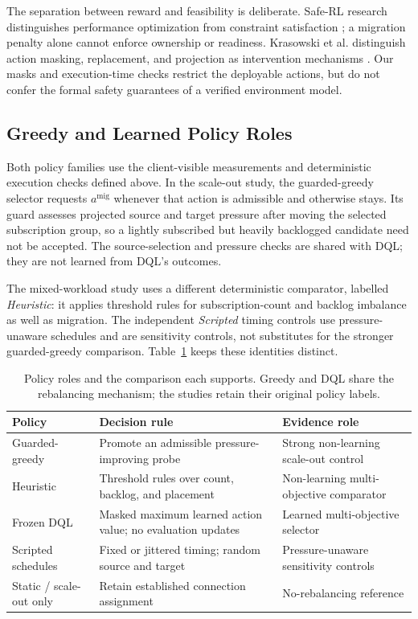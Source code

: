 \documentclass[manuscript,nonacm]{acmart}
\begin{document}
The separation between reward and feasibility is deliberate. Safe-RL research
distinguishes performance optimization from constraint satisfaction
\cite{Gu2024SafeRL}; a migration penalty alone cannot enforce ownership or
readiness. Krasowski et al. distinguish action masking, replacement, and
projection as intervention mechanisms \cite{Krasowski2023ProvablySafe}.
Our masks and execution-time checks restrict the deployable actions, but do
not confer the formal safety guarantees of a verified environment model.

\subsection{Greedy and Learned Policy Roles}
Both policy families use the client-visible measurements and deterministic
execution checks defined above. In the scale-out study, the guarded-greedy
selector requests $a^{\mathrm{mig}}$ whenever that action is admissible and
otherwise stays. Its guard assesses projected source and target pressure
after moving the selected subscription group, so a lightly subscribed but
heavily backlogged candidate need not be accepted. The source-selection and
pressure checks are shared with DQL; they are not learned from DQL's outcomes.

The mixed-workload study uses a different deterministic comparator, labelled
\emph{Heuristic}: it applies threshold rules for subscription-count and backlog
imbalance as well as migration. The independent \emph{Scripted} timing controls
use pressure-unaware schedules and are sensitivity controls, not substitutes
for the stronger guarded-greedy comparison. Table~\ref{tab:policy-roles}
keeps these identities distinct.

\begin{table}[!htbp]
\centering\small
\caption{Policy roles and the comparison each supports. Greedy and DQL share
the rebalancing mechanism; the studies retain their original policy labels.}
\label{tab:policy-roles}
\begin{tabular}{p{}p{}p{}}
\toprule
Policy & Decision rule & Evidence role\\
\midrule
Guarded-greedy & Promote an admissible pressure-improving probe & Strong non-learning scale-out control\\
Heuristic & Threshold rules over count, backlog, and placement & Non-learning multi-objective comparator\\
Frozen DQL & Masked maximum learned action value; no evaluation updates & Learned multi-objective selector\\
Scripted schedules & Fixed or jittered timing; random source and target & Pressure-unaware sensitivity controls\\
Static / scale-out only & Retain established connection assignment & No-rebalancing reference\\
\bottomrule
\end{tabular}
\end{table}
\end{document}
